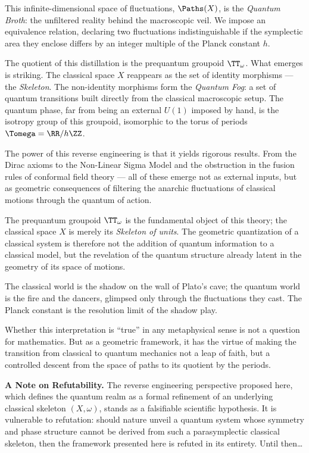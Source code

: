 This infinite-dimensional space of fluctuations,
$\Paths(X)$,
is the \emph{Quantum Broth}:
the unfiltered reality behind the macroscopic veil.
We impose an equivalence relation,
declaring two fluctuations indistinguishable
if the symplectic area they enclose differs by an integer multiple of the Planck constant $h$.

The quotient of this distillation is the prequantum groupoid $\TT_\omega$.
What emerges is striking.
The classical space $X$ reappears as the set of identity morphisms ---
the \emph{Skeleton}.
The non-identity morphisms form the \emph{Quantum Fog}:
a set of quantum transitions built directly from the classical macroscopic setup.
The quantum phase,
far from being an external $U(1)$ imposed by hand,
is the isotropy group of this groupoid,
isomorphic to the torus of periods $\Tomega = \RR/h\ZZ$.

The power of this reverse engineering is that it yields rigorous results.
From the Dirac axioms
to the Non-Linear Sigma Model and the obstruction in the fusion rules of conformal field theory ---
all of these emerge not as external inputs,
but as geometric consequences of filtering
the anarchic fluctuations of classical motions
through the quantum of action.

The prequantum groupoid $\TT_\omega$ is the fundamental object of this theory;
the classical space $X$ is merely its \emph{Skeleton of units}.
The geometric quantization of a classical system
is therefore not the addition of quantum information to a classical model,
but the revelation of the quantum structure
already latent in the geometry of its space of motions.

The classical world is the shadow on the wall of Plato's cave;
the quantum world is the fire and the dancers,
glimpsed only through the fluctuations they cast.
The Planck constant is the resolution limit of the shadow play.

Whether this interpretation is ``true''
in any metaphysical sense is not a question for mathematics.
But as a geometric framework,
it has the virtue of making the transition
from classical to quantum mechanics
not a leap of faith,
but a controlled descent
from the space of paths to its quotient by the periods.

\textbf{A Note on Refutability.}
The reverse engineering perspective proposed here,
which defines the quantum realm as a formal refinement of an underlying classical skeleton $(X, \omega)$,
stands as a falsifiable scientific hypothesis.
It is vulnerable to refutation:
should nature unveil a quantum system whose symmetry and phase structure cannot be derived from such a parasymplectic classical skeleton,
then the framework presented here is refuted in its entirety.
Until then\dots

